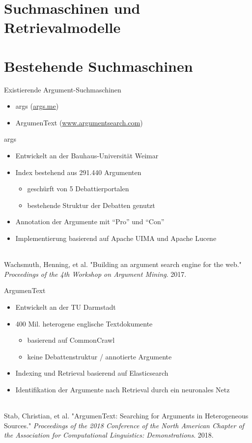 \documentclass{beamer}
\begin{document}
	\section{Suchmaschinen und Retrievalmodelle}

	\section{Bestehende Suchmaschinen}
	\begin{frame}{Existierende Argument-Suchmaschinen}
		\begin{itemize}
			\item args (\url{args.me})
			\item ArgumenText (\url{www.argumentsearch.com})
		\end{itemize}
	\end{frame}
	\begin{frame}{args}
		\begin{itemize}
			\item Entwickelt an der Bauhaus-Universität Weimar
			\item Index bestehend aus 291.440 Argumenten
			\begin{itemize}
				\item geschürft von 5 Debattierportalen
				\item bestehende Struktur der Debatten genutzt
			\end{itemize}
			\item Annotation der Argumente mit ``Pro'' und ``Con''
			\item Implementierung basierend auf Apache UIMA und Apache Lucene
		\end{itemize}
		~\\
		\tiny Wachsmuth, Henning, et al. "Building an argument search engine for the web."
		\textit{Proceedings of the 4th Workshop on Argument Mining}. 2017.
	\end{frame}
	\begin{frame}{ArgumenText}
		\begin{itemize}
			\item Entwickelt an der TU Darmstadt
			\item 400 Mil. heterogene englische Textdokumente
			\begin{itemize}
				\item basierend auf CommonCrawl
				\item keine Debattenstruktur / annotierte Argumente
			\end{itemize}
			\item Indexing und Retrieval basierend auf Elasticsearch
			\item Identifikation der Argumente nach Retrieval durch ein neuronales Netz
		\end{itemize}
		~\\
		\tiny Stab, Christian, et al. "ArgumenText: Searching for Arguments in Heterogeneous Sources."
		\textit{Proceedings of the 2018 Conference of the North American Chapter of the Association for
		Computational Linguistics: Demonstrations}. 2018.
	\end{frame}
\end{document}
